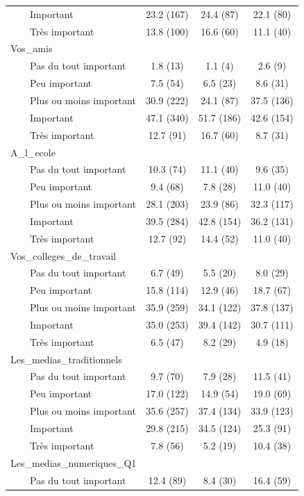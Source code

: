 \documentclass[
]{article}
\begin{document}
\begin{table}[!t]
\begin{tabular*}{\linewidth}{@{\extracolsep{\fill}}lccc}
    Important & 23.2 (167) & 24.4 (87) & 22.1 (80) \\ 
    Très important & 13.8 (100) & 16.6 (60) & 11.1 (40) \\ 
Vos\_amis &  &  &  \\ 
    Pas du tout important & 1.8 (13) & 1.1 (4) & 2.6 (9) \\ 
    Peu important & 7.5 (54) & 6.5 (23) & 8.6 (31) \\ 
    Plus ou moins important & 30.9 (222) & 24.1 (87) & 37.5 (136) \\ 
    Important & 47.1 (340) & 51.7 (186) & 42.6 (154) \\ 
    Très important & 12.7 (91) & 16.7 (60) & 8.7 (31) \\ 
A\_l\_ecole &  &  &  \\ 
    Pas du tout important & 10.3 (74) & 11.1 (40) & 9.6 (35) \\ 
    Peu important & 9.4 (68) & 7.8 (28) & 11.0 (40) \\ 
    Plus ou moins important & 28.1 (203) & 23.9 (86) & 32.3 (117) \\ 
    Important & 39.5 (284) & 42.8 (154) & 36.2 (131) \\ 
    Très important & 12.7 (92) & 14.4 (52) & 11.0 (40) \\ 
Vos\_colleges\_de\_travail &  &  &  \\ 
    Pas du tout important & 6.7 (49) & 5.5 (20) & 8.0 (29) \\ 
    Peu important & 15.8 (114) & 12.9 (46) & 18.7 (67) \\ 
    Plus ou moins important & 35.9 (259) & 34.1 (122) & 37.8 (137) \\ 
    Important & 35.0 (253) & 39.4 (142) & 30.7 (111) \\ 
    Très important & 6.5 (47) & 8.2 (29) & 4.9 (18) \\ 
Les\_medias\_traditionnels &  &  &  \\ 
    Pas du tout important & 9.7 (70) & 7.9 (28) & 11.5 (41) \\ 
    Peu important & 17.0 (122) & 14.9 (54) & 19.0 (69) \\ 
    Plus ou moins important & 35.6 (257) & 37.4 (134) & 33.9 (123) \\ 
    Important & 29.8 (215) & 34.5 (124) & 25.3 (91) \\ 
    Très important & 7.8 (56) & 5.2 (19) & 10.4 (38) \\ 
Les\_medias\_numeriques\_Q1 &  &  &  \\ 
    Pas du tout important & 12.4 (89) & 8.4 (30) & 16.4 (59) \\ 

\end{tabular*}
\end{table}
\end{document}
